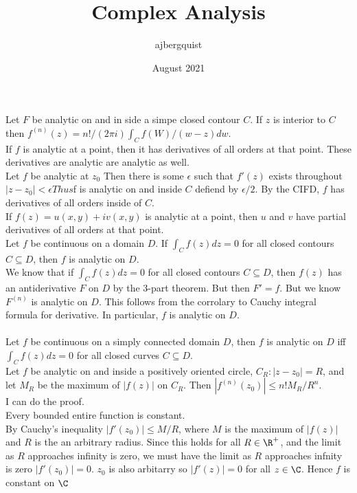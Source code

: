 \documentclass{article}
\title{Complex Analysis}
\author{ajbergquist }
\date{August 2021}
\begin{document}
Let $F$ be analytic on and in side a simpe closed contour $C$. If $z$ is interior to $C$  then 
$f^{(n)}(z) = n!/(2\pi i)\int_Cf(W)/(w-z)dw.$\\

 If $f$ is analytic at a point, then it has derivatives of all orders at that point. These derivatives are analytic are analytic as well.\\

 Let $f$ be analytic at $z_0$ Then there is some $\epsilon$ such that $f'(z)$ exists throughout $|z-z_0|<\epsilon Thus $f
 is analytic on and inside $C$ defiend by $\epsilon/2 .$ By the CIFD, $f$ has derivatives of all orders inside of $C$. \\
 
  If $f(z) = u(x,y) + iv(x,y)$ is analytic at a point, then $u$ and $v$ have partial derivatives of all orders at that point. \\
  Let $f$ be continuous on a domain $D$. If $\int_Cf(z)dz = 0$ for all closed contours $C\subseteq D$, then $f$ is analytic on $D$. \\
 
  We know that if $\int_Cf(z)dz = 0$ for all closed contours $C\subseteq D$, then $f(z)$ has an antiderivative $F$ on $D$ by the 3-part theorem. But then $F' = f$. But we know $F^{(n)}$ is analytic on $D$. This follows from the corrolary to Cauchy integral formula for derivative. In particular, $f$ is analytic on $D$. \\
 
 
 
 \\
 
  Let $f$ be continuous on a simply connected domain $D$, then $f$ is analytic on $D$ iff $\int_Cf(z)dz = 0$ for all closed curves $C\subseteq D$. \\
 
  Let $f$ be analytic on and inside a positively oriented circle, $C_R:|z-z_0| = R$, and let $M_R$ be the maximum of $|f(z)|$ on $C_R$. Then $|f^{(n)}(z_0)| \le n!M_R/R^n.$\\
 
  I can do the proof.\\
 
  Every bounded entire function is constant.\\
  By Cauchy's inequality $|f'(z_0)|\le M/R$, where $M$ is the maximum of $|f(z)|$ and $R$ is the an arbitrary radius. Since this holds for all $R\in \R^+$, and the limit as $R$ approaches infinity is zero, we must have the limit as $R$ approaches infnity is zero $|f'(z_0)| = 0$. $z_0$ is also arbitarry so $|f'(z)| = 0$ for all $z\in \C$. Hence $f$ is constant on $\C$
 
\end{document}
